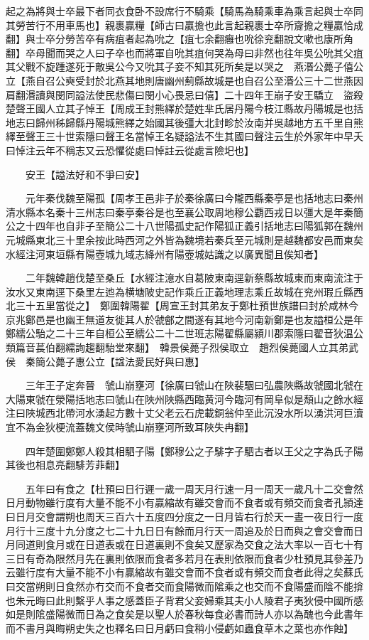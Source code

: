 起之為將與士卒最下者同衣食卧不設席行不騎乘【騎馬為騎乘車為乘言起與士卒同其勞苦行不用車馬也】親裹贏糧【師古曰贏擔也此言起親裹士卒所齎擔之糧贏恰成翻】與士卒分勞苦卒有病疽者起為吮之【疽七余翻癰也吮徐兖翻說文嗽也康所角翻】卒母聞而哭之人曰子卒也而將軍自吮其疽何哭為母曰非然也往年吳公吮其父疽其父戰不旋踵遂死于敵吳公今又吮其子妾不知其死所矣是以哭之　燕湣公薨子僖公立【燕自召公奭受封於北燕其地則唐幽州薊縣故城是也自召公至湣公三十二世燕因肩翻湣讀與閔同謚法使民悲傷曰閔小心畏忌曰僖】二十四年王崩子安王驕立　盜殺楚聲王國人立其子悼王【周成王封熊繹於楚姓芈氏居丹陽今枝江縣故丹陽城是也括地志曰歸州秭歸縣丹陽城熊繹之始國其後彊大北封畛於汝南并吳越地方五千里自熊繹至聲王三十世索隱曰聲王名當悼王名疑謚法不生其國曰聲注云生於外家年中早夭曰悼注云年不稱志又云恐懼從處曰悼註云從處言險圯也】

　　安王【謚法好和不爭曰安】

　　元年秦伐魏至陽孤【周孝王邑非子於秦徐廣曰今隴西縣秦亭是也括地志曰秦州清水縣本名秦十三州志曰秦亭秦谷是也至襄公取周地穆公覇西戎日以彊大是年秦簡公之十四年也自非子至簡公二十八世陽孤史記作陽狐正義引括地志曰陽狐郭在魏州元城縣東北三十里余按此時西河之外皆為魏境若秦兵至元城則是越魏都安邑而東矣水經注河東垣縣有陽壺城九域志絳州有陽壺城姑識之以廣異聞且俟知者】

　　二年魏韓趙伐楚至桑丘【水經注澺水自葛陂東南逕新蔡縣故城東而東南流注于汝水又東南逕下桑里左迆為横塘陂史記作乘丘正義地理志乘丘故城在兖州瑕丘縣西北三十五里當從之】　鄭圍韓陽翟【周宣王封其弟友于鄭杜預世族譜曰封於咸林今京兆鄭邑是也幽王無道友徙其人於虢鄶之間遂有其地今河南新鄭是也友謚桓公是年鄭繻公駘之二十三年自桓公至繻公二十二世班志陽翟縣屬潁川郡索隱曰翟音狄温公類篇音萇伯翻繻詢趨翻駘堂來翻】　韓景侯薨子烈侯取立　趙烈侯薨國人立其弟武侯　秦簡公薨子惠公立【諡法愛民好與曰惠】

　　三年王子定奔晉　虢山崩壅河【徐廣曰虢山在陜裴駰曰弘農陜縣故虢國北虢在大陽東虢在滎陽括地志曰虢山在陜州陜縣西臨黄河今臨河有岡阜似是頹山之餘水經注曰陜城西北帶河水湧起方數十丈父老云石虎載銅翁仲至此沉没水所以湧洪河巨瀆宜不為金狄梗流蓋魏文侯時虢山崩壅河所致耳陜失冉翻】

　　四年楚圍鄭鄭人殺其相駟子陽【鄭穆公之子騑字子駟古者以王父之字為氏子陽其後也相息亮翻騑芳菲翻】

　　五年曰有食之【杜預曰日行遲一歲一周天月行速一月一周天一歲凡十二交會然日月動物雖行度有大量不能不小有贏縮故有雖交會而不食者或有頻交而食者孔頴達曰日月交會謂朔也周天三百六十五度四分度之一日月皆右行於天一晝一夜日行一度月行十三度十九分度之七二十九日日有餘而月行天一周追及於日而與之會交會而日月同道則食月或在日道表或在日道裏則不食矣又歷家為交食之法大率以一百七十有三日有奇為限然月先在裏則依限而食者多若月在表則依限而食者少杜預見其參差乃云雖行度有大量不能不小有贏縮故有雖交會而不食者或有頻交而食者此得之矣蘇氏曰交當朔則日食然亦冇交而不食者交而食陽微而隂乘之也交而不食陽盛而陰不能揜也朱元晦曰此則繫乎人事之感蓋臣子背君父妾婦乘其夫小人陵君子夷狄侵中國所感如是則隂盛陽微而日為之食矣是以聖人於春秋每食必書而詩人亦以為醜也今此書年而不書月與晦朔史失之也釋名曰日月虧曰食稍小侵虧如蟲食草木之葉也亦作蝕】

